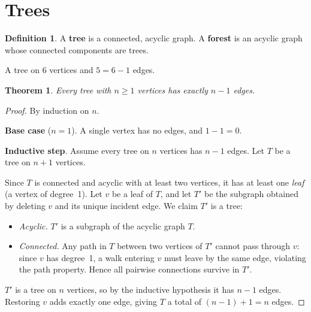 \documentclass[11pt]{article}
\newtheorem{theorem}{Theorem}
\theoremstyle{definition}
\newtheorem*{definition*}{Definition}
\begin{document}
\section*{Trees}

\begin{definition*}
A \textbf{tree} is a connected, acyclic graph.
A \textbf{forest} is an acyclic graph whose connected components are trees.
\end{definition*}

\begin{center}

\smallskip
{\small A tree on $6$ vertices and $5 = 6-1$ edges.}
\end{center}

\begin{theorem}
Every tree with $n \geq 1$ vertices has exactly $n - 1$ edges.
\end{theorem}

\begin{proof}
By induction on $n$.

\textbf{Base case} ($n = 1$). A single vertex has no edges, and $1 - 1 = 0$.

\textbf{Inductive step}. Assume every tree on $n$ vertices has $n - 1$ edges.
Let $T$ be a tree on $n + 1$ vertices.

Since $T$ is connected and acyclic with at least two vertices, it has at least one
\emph{leaf} (a vertex of degree~1). Let $v$ be a leaf of $T$, and let $T'$ be the
subgraph obtained by deleting $v$ and its unique incident edge. We claim $T'$ is a
tree:
\begin{itemize}
  \item \emph{Acyclic.} $T'$ is a subgraph of the acyclic graph $T$.
  \item \emph{Connected.} Any path in $T$ between two vertices of $T'$ cannot pass
    through $v$: since $v$ has degree~1, a walk entering $v$ must leave by the same
    edge, violating the path property. Hence all pairwise connections survive in $T'$.
\end{itemize}
$T'$ is a tree on $n$ vertices, so by the inductive hypothesis it has $n - 1$ edges.
Restoring $v$ adds exactly one edge, giving $T$ a total of $(n - 1) + 1 = n$ edges.
\end{proof}
\end{document}
